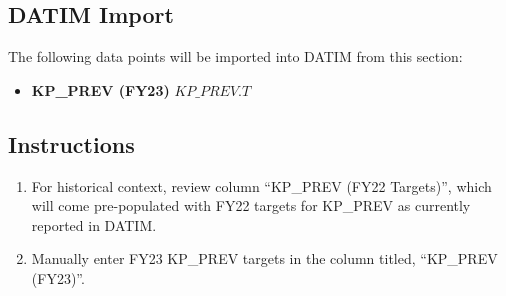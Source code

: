\documentclass[
  openany]{book}
\providecommand{\tightlist}{%
  \setlength{\itemsep}{0pt}\setlength{\parskip}{0pt}}
\begin{document}
\begin{table}
\centering\begingroup\fontsize{12}{14}\selectfont

\endgroup{}
\end{table}

\hypertarget{datim-import-35}{%
\subsection{DATIM Import}\label{datim-import-35}}

The following data points will be imported into DATIM from this section:

\begin{itemize}
\tightlist
\item
  \textbf{KP\_PREV (FY23)} \(KP\_PREV.T\)
\end{itemize}

\hypertarget{instructions-35}{%
\subsection{Instructions}\label{instructions-35}}

\begin{enumerate}
\def\labelenumi{\arabic{enumi}.}
\item
  For historical context, review column ``KP\_PREV (FY22 Targets)'',
  which will come pre-populated with FY22 targets for KP\_PREV as
  currently reported in DATIM.
\item
  Manually enter FY23 KP\_PREV targets in the column titled, ``KP\_PREV
  (FY23)''.
\end{enumerate}
\end{document}
